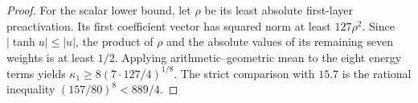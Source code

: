 \begin{proof}
For the scalar lower bound, let $\rho$ be its least absolute first-layer
preactivation. Its first coefficient vector has squared norm at least
$127\rho^2$. Since $|\tanh u|\le|u|$, the product of $\rho$ and the
absolute values of its remaining seven weights is at least $1/2$.
Applying arithmetic--geometric mean to the eight energy terms yields
$\kappa_1\ge8(7\cdot127/4)^{1/8}$. The strict comparison with $15.7$
is the rational inequality $(157/80)^8<889/4$.
\end{proof}

